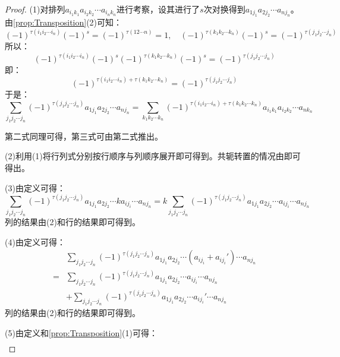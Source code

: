 \begin{proof}
	(1)对排列$a_{i_1k_1}a_{i_2k_2}\cdots a_{i_nk_n}$进行考察，设其进行了$s$次对换得到$a_{1j_1}a_{2j_2}\cdots a_{nj_n}$。由\cref{prop:Transposition}(2)可知：
	\begin{equation*}
		(-1)^{\tau(i_1i_2\cdots i_n)}(-1)^{s}=(-1)^{\tau(12\cdots n)}=1,\quad
		(-1)^{\tau(k_1k_2\cdots k_n)}(-1)^{s}=(-1)^{\tau(j_1j_2\cdots j_n)}
	\end{equation*}
	所以：
	\begin{equation*}
		(-1)^{\tau(i_1i_2\cdots i_n)}(-1)^{s}(-1)^{\tau(k_1k_2\cdots k_n)}(-1)^{s}=(-1)^{\tau(j_1j_2\cdots j_n)}
	\end{equation*}
	即：
	\begin{equation*}
		(-1)^{\tau(i_1i_2\cdots i_n)+\tau(k_1k_2\cdots k_n)}=(-1)^{\tau(j_1j_2\cdots j_n)}
	\end{equation*}
	于是：
	\begin{equation*}
		\sum_{j_1j_2\cdots j_n}(-1)^{\tau(j_1j_2\cdots j_n)}a_{1j_1}a_{2j_2}\cdots a_{nj_n}=\sum_{k_1k_2\cdots k_n}(-1)^{\tau(i_1i_2\cdots i_n)+\tau(k_1k_2\cdots k_n)}a_{i_1k_1}a_{i_2k_2}\cdots a_{nk_n}
	\end{equation*}\par
	第二式同理可得，第三式可由第二式推出。\par
	(2)利用(1)将行列式分别按行顺序与列顺序展开即可得到。共轭转置的情况由即可得出。\par
	(3)由定义可得：
	\begin{equation*}
		\sum_{j_1j_2\cdots j_n}(-1)^{\tau(j_1j_2\cdots j_n)}a_{1j_1}a_{2j_2}\cdots ka_{ij_i}\cdots a_{nj_n}=k\sum_{j_1j_2\cdots j_n}(-1)^{\tau(j_1j_2\cdots j_n)}a_{1j_1}a_{2j_2}\cdots a_{ij_i}\cdots a_{nj_n}
	\end{equation*}
	列的结果由(2)和行的结果即可得到。\par
	(4)由定义可得：
	\begin{align*}
		&\sum_{j_1j_2\cdots j_n}(-1)^{\tau(j_1j_2\cdots j_n)}a_{1j_1}a_{2j_2}\cdots (a_{ij_i}+a_{ij_i}')\cdots a_{nj_n} \\
		=&\sum_{j_1j_2\cdots j_n}(-1)^{\tau(j_1j_2\cdots j_n)}a_{1j_1}a_{2j_2}\cdots a_{ij_i}\cdots a_{nj_n} \\
		&+\sum_{j_1j_2\cdots j_n}(-1)^{\tau(j_1j_2\cdots j_n)}a_{1j_1}a_{2j_2}\cdots a_{ij_i}'\cdots a_{nj_n}
	\end{align*}
	列的结果由(2)和行的结果即可得到。\par
	(5)由定义和\cref{prop:Transposition}(1)可得：
	\begin{align*}

\end{align*}
\end{proof}
